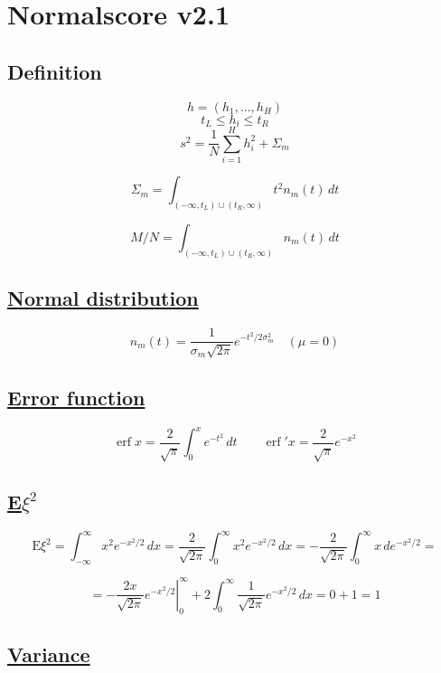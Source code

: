 \documentclass[12pt]{article}
\begin{document}
\section*{Normalscore v2.1}

\subsection*{Definition}

\[ h = (h_1, ..., h_H) \]
\[ t_L \leq h_i \leq t_R \]
\[
s^2 =
\frac{1}{N} \sum_{i = 1}^{H} h_i^2 + \Sigma_m
\]

\begin{equation}
\Sigma_m = \int_{(-\infty, t_L) \cup (t_R, \infty)} t^2 n_m(t) \,dt
\label{eq:def_Sigma_m}
\end{equation}

\[
M / N = \int_{(-\infty, t_L) \cup (t_R, \infty)} n_m(t) \,dt
\]

\subsection*{\href{https://en.wikipedia.org/wiki/Normal_distribution}{Normal distribution}}

\[
n_m(t) = \frac{1}{\sigma_m\sqrt{2 \pi }} e^{-t^2/2\sigma_m^2} \quad (\mu = 0)
\]

\subsection*{\href{https://en.wikipedia.org/wiki/Error_function}{Error function}}

\[
\operatorname{erf} x = \frac{2}{\sqrt{\pi}} \int_{0}^{x} e^{-t^2} \,dt
\quad\quad
\operatorname{erf}'x = \frac{2}{\sqrt{\pi}} e^{-x^{2}}
\]

\subsection*{\href{https://tvims.nsu.ru/chernova/tv/lec/node46.htmln}{E\(\xi^2\)}}

\[
\text{E}\xi^2 = \int_{-\infty}^{\infty} x^2 e^{-x^2/2} \,dx =
\frac{2}{\sqrt{2\pi}} \int_{0}^{\infty} x^2 e^{-x^2/2} \,dx =
-\frac{2}{\sqrt{2\pi}} \int_{0}^{\infty} x \,de^{-x^2/2} =
\]

\[
= \left. -\frac{2x}{\sqrt{2\pi}} e^{-x^2/2} \right|_0^\infty +
2 \int_{0}^{\infty} \frac{1}{\sqrt{2\pi}} e^{-x^2/2} \,dx = 0 + 1 = 1
\]

\subsection*{\href{https://en.wikipedia.org/wiki/Variance}{Variance}}
\end{document}
